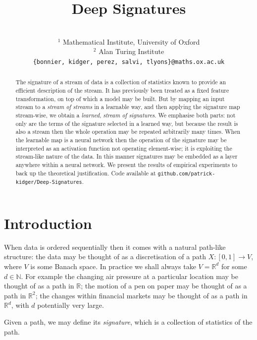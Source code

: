 \documentclass{article}
\title{Deep Signatures}
\author{ %
	\equallength{Patric Bonnier$^{1, }$\thanks{Equal contribution.}}
	\And
	\equallength{Patrick Kidger$^{1, 2, }$\footnotemark[1]}
	\And
	\equallength{Imanol Perez Arribas$^{1, 2, }$\footnotemark[1]}
	\And
	\equallength{Cristopher Salvi$^{1, 2, }$\footnotemark[1]}
	\And
	\equallength{Terry Lyons$^{1, 2}$}
	\AND \\[-12pt]
	\null$^1$ Mathematical Institute, University of Oxford \\
	\null$^2$ Alan Turing Institute \\
	\texttt{\{bonnier, kidger, perez, salvi, tlyons\}@\hspace{0.1pt}maths.ox.ac.uk}
}
\theoremstyle{plain}
\theoremstyle{definition}
\newcommand{\nomath}[1]{\ifmmode
\mathrm{#1}%
\else
#1%
\fi}
\newcommand{\TODO}[1][]{\textcolor{red}{\ifx&#1&
\nomath{TODO}
\else
\nomath{TODO: #1}
\fi}}
\begin{document}
	\maketitle
	\begin{abstract}
		The signature of a stream of data is a collection of statistics known to provide an efficient description of the stream. It has previously been treated as a fixed feature transformation, on top of which a model may be built. But by mapping an input stream to a \emph{stream of streams} in a learnable way, and then applying the signature map stream-wise, we obtain a \emph{learned}, \emph{stream of signatures}. We emphasise both parts: not only are the terms of the signature selected in a learned way, but because the result is also a stream then the whole operation may be repeated arbitrarily many times. When the learnable map is a neural network then the operation of the signature may be interpreted as an activation function not operating element-wise; it is exploiting the stream-like nature of the data. In this manner signatures may be embedded as a layer anywhere within a neural network. We present the results of empirical experiments to back up the theoretical justification. Code available at \texttt{github.com/patrick-kidger/Deep-Signatures}.
	\end{abstract}
	\section{Introduction}
	When data is ordered sequentially then it comes with a natural path-like structure: the data may be thought of as a discretisation of a path $X \colon [0, 1] \to V$, where $V$ is some Banach space. In practice we shall always take $V = \mathbb R^d$ for some $d \in \mathbb N$. For example the changing air pressure at a particular location may be thought of as a path in $\mathbb R$; the motion of a pen on paper may be thought of as a path in $ \mathbb R^2$; the changes within financial markets may be thought of as a path in $\mathbb R^d$, with $d$ potentially very large.
	
	Given a path, we may define its \emph{signature}, which is a collection of statistics of the path.
	
\end{document}
